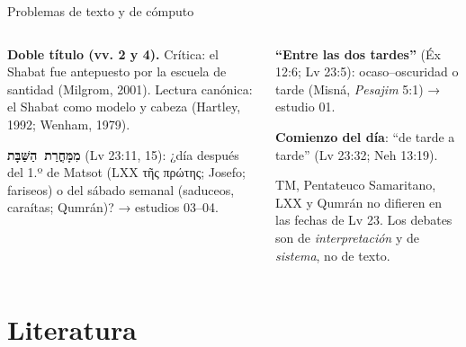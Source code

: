 \documentclass[hyperref={bookmarks=false},aspectratio=169]{beamer}
\newcommand{\heb}[1]{\mbox{\foreignlanguage{hebrew}{#1}}}
\newcommand{\grc}[1]{\foreignlanguage{ancientgreek}{#1}}
\newcommand{\destacar}[1]{\textbf{\textcolor{tierraroja}{#1}}}
\begin{document}
\begin{frame}{Problemas de texto y de cómputo}
\begin{columns}[t,onlytextwidth]
\begin{column}{0.50\textwidth}\scriptsize
\destacar{Doble título (vv. 2 y 4).} Crítica: el Shabat fue antepuesto por la escuela de santidad (Milgrom, 2001). Lectura canónica: el Shabat como modelo y cabeza (Hartley, 1992; Wenham, 1979).\par\medskip
\destacar{\heb{מִמָּחֳרַת הַשַּׁבָּת}} (Lv 23:11, 15): ¿día después del 1.º de Matsot (LXX \grc{τῆς πρώτης}; Josefo; fariseos) o del sábado semanal (saduceos, caraítas; Qumrán)? → estudios 03--04.
\end{column}
\begin{column}{0.48\textwidth}\scriptsize
\destacar{``Entre las dos tardes''} (Éx 12:6; Lv 23:5): ocaso--oscuridad o tarde (Misná, \emph{Pesajim} 5:1) → estudio 01.\par\medskip
\destacar{Comienzo del día}: ``de tarde a tarde'' (Lv 23:32; Neh 13:19).\par\medskip
\begin{tcolorbox}[colback=mostaza!12,colframe=mostaza!85!tierraroja,boxrule=0.6pt,arc=2pt,left=3pt,right=3pt,top=2pt,bottom=2pt,fonttitle=\bfseries\scriptsize,coltitle=caferojizo,colbacktitle=mostaza!30,title={Precisión textual}]
\scriptsize TM, Pentateuco Samaritano, LXX y Qumrán no difieren en las fechas de Lv 23. Los debates son de \emph{interpretación} y de \emph{sistema}, no de texto.
\end{tcolorbox}
\end{column}
\end{columns}
\end{frame}

\section{Literatura}
\end{document}
